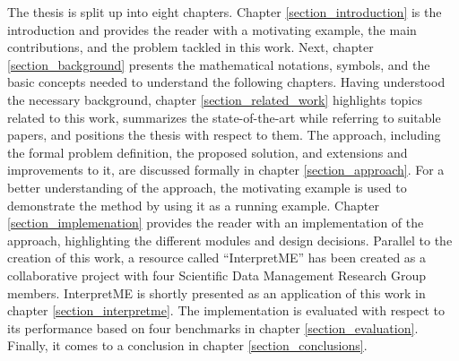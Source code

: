The thesis is split up into eight chapters. Chapter \ref{section_introduction} is the introduction and provides the reader with a motivating example, the main contributions, and the problem tackled in this work. Next, chapter \ref{section_background} presents the mathematical notations, symbols, and the basic concepts needed to understand the following chapters. Having understood the necessary background, chapter \ref{section_related_work} highlights topics related to this work, summarizes the state-of-the-art while referring to suitable papers, and positions the thesis with respect to them. The approach, including the formal problem definition, the proposed solution, and extensions and improvements to it, are discussed formally in chapter \ref{section_approach}. For a better understanding of the approach, the motivating example is used to demonstrate the method by using it as a running example. Chapter \ref{section_implemenation} provides the reader with an implementation of the approach, highlighting the different modules and design decisions. Parallel to the creation of this work, a resource called ``InterpretME'' has been created as a collaborative project with four Scientific Data Management Research Group members. InterpretME \cite{interpretME} is shortly presented as an application of this work in chapter \ref{section_interpretme}. The implementation is evaluated with respect to its performance based on four benchmarks in chapter \ref{section_evaluation}. Finally, it comes to a conclusion in chapter \ref{section_conclusions}. 